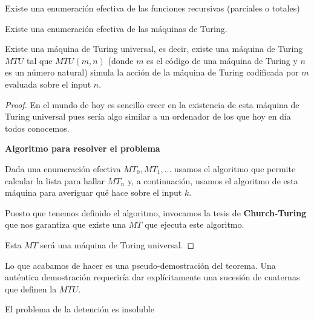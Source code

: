 \begin{theorem}
Existe una enumeración efectiva de las funciones recursivas (parciales o totales)
\end{theorem}

\begin{theorem}
Existe una enumeración efectiva de las máquinas de Turing.
\end{theorem}

\begin{theorem}
Existe una máquina de Turing universal, es decir, existe una máquina de Turing $MTU$ tal que $MTU(m,n)$ (donde $m$ es el código de una máquina de Turing y $n$ es un número natural) simula la acción de la máquina de Turing codificada por $m$ evaluada sobre el input $n$.
\end{theorem}
\begin{proof}
En el mundo de hoy es sencillo creer en la existencia de esta máquina de Turing universal pues sería algo similar a un ordenador de los que hoy en día todos conocemos.

\textbf{Algoritmo para resolver el problema}

Dada una enumeración efectiva $MT_0,MT_1,...$ usamos el algoritmo que permite calcular la lista para hallar $MT_n$ y, a continuación, usamos el algoritmo de esta máquina para averiguar qué hace sobre el input $k$.

Puesto que tenemos definido el algoritmo, invocamos la tesis de \textbf{Church-Turing} que nos garantiza que existe una $MT$ que ejecuta este algoritmo.

Esta $MT$ será una máquina de Turing universal.
\end{proof}

\obs Lo que acabamos de hacer es una pseudo-demostración del teorema. Una auténtica demostración requeriría dar explícitamente una sucesión de cuaternas que definen la $MTU$.

\begin{theorem}
El problema de la detención es insoluble
\end{theorem}